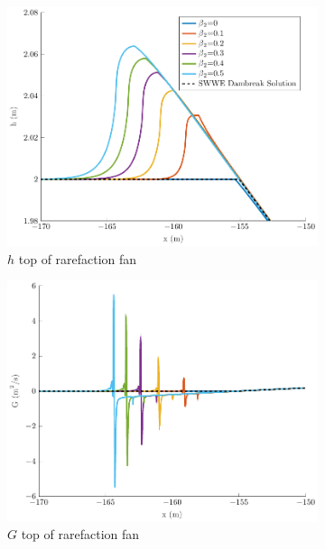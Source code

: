 \documentclass[10pt]{elsarticle}
\begin{document}
\begin{figure}
	\centering
	\begin{subfigure}{0.32\textwidth}
		\centering
		\includegraphics[width=\textwidth]{./Figures/Simulations/Study/RegSWWE/Convergence/hRFtop.pdf}
		\caption{$h$ top of rarefaction fan}
	\end{subfigure}
	\begin{subfigure}{0.32\textwidth}
		\centering
		\includegraphics[width=\textwidth]{./Figures/Simulations/Study/RegSWWE/Convergence/GRFtop.pdf}
		\caption{$G$ top of rarefaction fan}
	\end{subfigure}
	\begin{subfigure}{0.32\textwidth}

\end{subfigure}
\end{figure}
\end{document}
